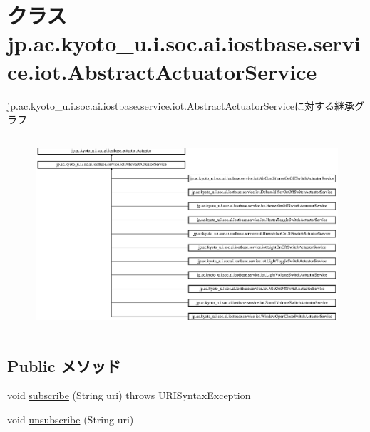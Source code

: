 \hypertarget{classjp_1_1ac_1_1kyoto__u_1_1i_1_1soc_1_1ai_1_1iostbase_1_1service_1_1iot_1_1_abstract_actuator_service}{\section{クラス jp.\-ac.\-kyoto\-\_\-u.\-i.\-soc.\-ai.\-iostbase.\-service.\-iot.\-Abstract\-Actuator\-Service}
\label{classjp_1_1ac_1_1kyoto__u_1_1i_1_1soc_1_1ai_1_1iostbase_1_1service_1_1iot_1_1_abstract_actuator_service}
}
jp.\-ac.\-kyoto\-\_\-u.\-i.\-soc.\-ai.\-iostbase.\-service.\-iot.\-Abstract\-Actuator\-Serviceに対する継承グラフ\begin{figure}[H]
\begin{center}
\leavevmode
\includegraphics[height=7.222222cm]{classjp_1_1ac_1_1kyoto__u_1_1i_1_1soc_1_1ai_1_1iostbase_1_1service_1_1iot_1_1_abstract_actuator_service}
\end{center}
\end{figure}
\subsection*{Public メソッド}
\begin{DoxyCompactItemize}
\item 
void \hyperlink{classjp_1_1ac_1_1kyoto__u_1_1i_1_1soc_1_1ai_1_1iostbase_1_1service_1_1iot_1_1_abstract_actuator_service_a97e707eb018bce03deb6021e3d14a0d6}{subscribe} (String uri)  throws U\-R\-I\-Syntax\-Exception 
\item 
void \hyperlink{classjp_1_1ac_1_1kyoto__u_1_1i_1_1soc_1_1ai_1_1iostbase_1_1service_1_1iot_1_1_abstract_actuator_service_aff3f640398c019fb1a715b2edd0dd07a}{unsubscribe} (String uri)
\end{DoxyCompactItemize}


